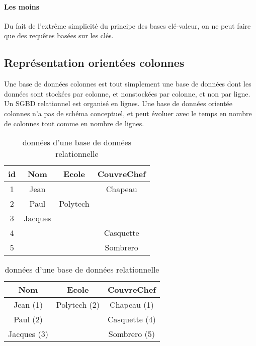 \documentclass[a4paper,11pt]{article}
\begin{document}
		\paragraph{Les moins}


		Du fait de l’extrême simplicité du principe des bases clé-valeur, on ne peut faire que des requêtes basées sur les clés.
		
		\subsection{Représentation orientées colonnes}
		Une base de données colonnes est tout simplement une base de données dont les données sont stockées par colonne, et nonstockées par colonne, et non par ligne. Un SGBD relationnel est organisé en lignes. Une base de données orientée colonnes n’a pas de schéma conceptuel, et peut évoluer avec le temps en nombre de colonnes tout comme en nombre de lignes.\\
		\begin{table}[h]
			\begin{center}
				\begin{tabular}{|c|c|c|c|}
				\hline 
				\textbf{id} & \textbf{Nom} & \textbf{Ecole} & \textbf{CouvreChef} \\ 
				\hline 
				\hline
				1 & Jean & & Chapeau \\ 
				\hline 
				2 & Paul & Polytech & \\ 
				\hline 
				3 & Jacques & &  \\ 
				\hline 
				4 & & & Casquette \\ 
				\hline 
				5 & & & Sombrero \\ 
				\hline	
				\end{tabular}
			\end{center}
			\caption{données d’une base de données relationnelle}
		\end{table}
	
		\begin{table}[h]
			\begin{center}
				\begin{tabular}{|c|c|c|}
				\hline 
				\textbf{Nom} & \textbf{Ecole} & \textbf{CouvreChef} \\ 
				\hline 
				\hline
				Jean (1) & Polytech (2) & Chapeau (1) \\ 
				\hline 
				Paul (2) &  & Casquette (4)\\ 
				\hline 
				Jacques (3) &  & Sombrero (5) \\ 
				\hline 	
				\end{tabular}
			\end{center}
			\caption{données d’une base de données relationnelle}
		\end{table}
\end{document}
